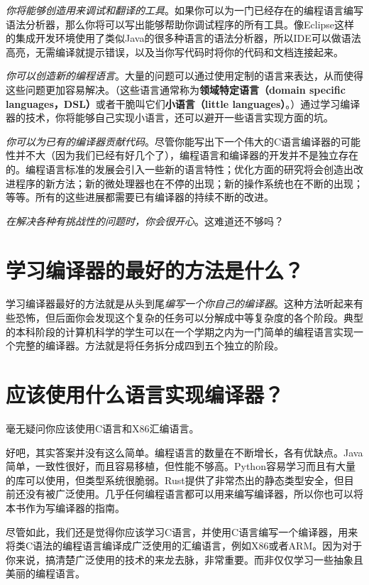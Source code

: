 \documentclass[cn,11pt,chinese]{elegantbook}
\begin{document}
\textit{你将能够创造用来调试和翻译的工具}。如果你可以为一门已经存在的编程语言编写语法分析器，那么你将可以写出能够帮助你调试程序的所有工具。像Eclipse这样的集成开发环境使用了类似Java的很多种语言的语法分析器，所以IDE可以做语法高亮，无需编译就提示错误，以及当你写代码时将你的代码和文档连接起来。

\textit{你可以创造新的编程语言}。大量的问题可以通过使用定制的语言来表达，从而使得这些问题更加容易解决。（这些语言通常称为\textbf{领域特定语言（domain specific languages，DSL）}或者干脆叫它们\textbf{小语言（little languages）}。）通过学习编译器的技术，你将能够自己实现小语言，还可以避开一些语言实现方面的坑。

\textit{你可以为已有的编译器贡献代码}。尽管你能写出下一个伟大的C语言编译器的可能性并不大（因为我们已经有好几个了），编程语言和编译器的开发并不是独立存在的。编程语言标准的发展会引入一些新的语言特性；优化方面的研究将会创造出改进程序的新方法；新的微处理器也在不停的出现；新的操作系统也在不断的出现；等等。所有的这些进展都需要已有编译器的持续不断的改进。

\textit{在解决各种有挑战性的问题时，你会很开心}。这难道还不够吗？

\section{学习编译器的最好的方法是什么？}

学习编译器最好的方法就是从头到尾\textit{编写一个你自己的编译器}。这种方法听起来有些恐怖，但后面你会发现这个复杂的任务可以分解成中等复杂度的各个阶段。典型的本科阶段的计算机科学的学生可以在一个学期之内为一门简单的编程语言实现一个完整的编译器。方法就是将任务拆分成四到五个独立的阶段。

\section{应该使用什么语言实现编译器？}

毫无疑问你应该使用C语言和X86汇编语言。

好吧，其实答案并没有这么简单。编程语言的数量在不断增长，各有优缺点。Java简单，一致性很好，而且容易移植，但性能不够高。Python容易学习而且有大量的库可以使用，但类型系统很脆弱。Rust提供了非常杰出的静态类型安全，但目前还没有被广泛使用。几乎任何编程语言都可以用来编写编译器，所以你也可以将本书作为写编译器的指南。

尽管如此，我们还是觉得你应该学习C语言，并使用C语言编写一个编译器，用来将类C语法的编程语言编译成广泛使用的汇编语言，例如X86或者ARM。因为对于你来说，搞清楚广泛使用的技术的来龙去脉，非常重要。而非仅仅学习一些抽象且美丽的编程语言。
\end{document}
